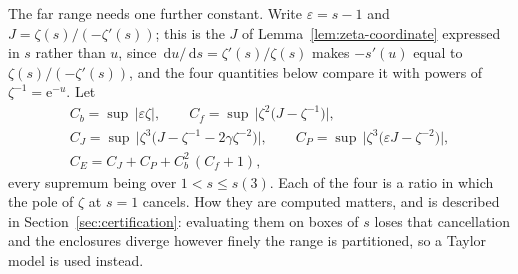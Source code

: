 \documentclass[11pt]{amsart}
\theoremstyle{plain}
\theoremstyle{definition}
\newcommand{\e}{\mathrm e}
\newcommand{\dd}{\,\mathrm d}
\newcommand{\abs}[1]{\lvert #1\rvert}
\begin{document}
The far range needs one further constant. Write $\varepsilon=s-1$ and
$J=\zeta(s)/(-\zeta'(s))$; this is the $J$ of
Lemma~\ref{lem:zeta-coordinate} expressed in $s$ rather than $u$, since
$\dd u/\dd s=\zeta'(s)/\zeta(s)$ makes $-s'(u)$ equal to
$\zeta(s)/(-\zeta'(s))$, and the four quantities below compare it with powers
of $\zeta^{-1}=\e^{-u}$. Let
\begin{equation}\label{eq:CE-def}
\begin{gathered}
 C_b=\sup\,\abs{\varepsilon\zeta},\qquad
 C_f=\sup\,\abs{\zeta^2\bigl(J-\zeta^{-1}\bigr)},\\
 C_J=\sup\,\bigl\lvert\zeta^3\bigl(J-\zeta^{-1}-2\gamma\zeta^{-2}\bigr)
   \bigr\rvert,\qquad
 C_P=\sup\,\bigl\lvert\zeta^3\bigl(\varepsilon J-\zeta^{-2}\bigr)\bigr\rvert,\\
 C_E=C_J+C_P+C_b^2\,(C_f+1),
\end{gathered}
\end{equation}
every supremum being over $1<s\leq s(3)$. Each of the four is a ratio in which
the pole of $\zeta$ at $s=1$ cancels. How they are computed matters, and is
described in Section~\ref{sec:certification}: evaluating them on boxes of $s$ loses that
cancellation and the enclosures diverge however finely the range is
partitioned, so a Taylor model is used instead.
\end{document}
